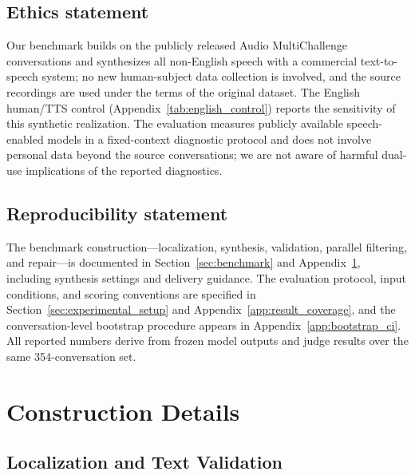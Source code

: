 \documentclass{article}
\begin{document}
\subsection*{Ethics statement}

Our benchmark builds on the publicly released Audio MultiChallenge conversations and synthesizes all non-English speech with a commercial text-to-speech system; no new human-subject data collection is involved, and the source recordings are used under the terms of the original dataset. The English human/TTS control (Appendix~\ref{tab:english_control}) reports the sensitivity of this synthetic realization. The evaluation measures publicly available speech-enabled models in a fixed-context diagnostic protocol and does not involve personal data beyond the source conversations; we are not aware of harmful dual-use implications of the reported diagnostics.

\subsection*{Reproducibility statement}

The benchmark construction---localization, synthesis, validation, parallel filtering, and repair---is documented in Section~\ref{sec:benchmark} and Appendix~\ref{app:construction_details}, including synthesis settings and delivery guidance. The evaluation protocol, input conditions, and scoring conventions are specified in Section~\ref{sec:experimental_setup} and Appendix~\ref{app:result_coverage}, and the conversation-level bootstrap procedure appears in Appendix~\ref{app:bootstrap_ci}. All reported numbers derive from frozen model outputs and judge results over the same 354-conversation set.




\clearpage
\appendix


\section{Construction Details}
\label{app:construction_details}

\subsection{Localization and Text Validation}
\end{document}
